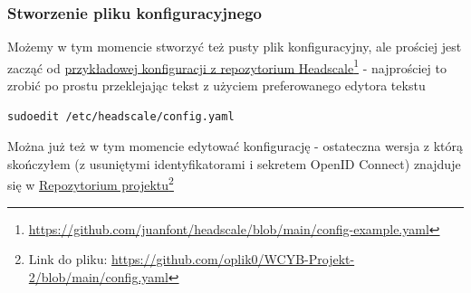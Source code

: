 \documentclass{report}
\numberwithin{equation}{section}
\begin{document}
\subsubsection{Stworzenie pliku konfiguracyjnego}

Możemy w tym momencie stworzyć też pusty plik konfiguracyjny, ale prościej jest zacząć od \href{https://github.com/juanfont/headscale/blob/main/config-example.yaml}{przykładowej konfiguracji z repozytorium Headscale}\footnote{\url{https://github.com/juanfont/headscale/blob/main/config-example.yaml}} - najprościej to zrobić po prostu przeklejając tekst z użyciem preferowanego edytora tekstu

\begin{verbatim}
sudoedit /etc/headscale/config.yaml
\end{verbatim}

Można już też w tym momencie edytować konfigurację - ostateczna wersja z którą skończyłem (z usuniętymi identyfikatorami i sekretem OpenID Connect) znajduje się w \href{https://github.com/oplik0/WCYB-Projekt-2/blob/main/config.yaml}{Repozytorium projektu}\footnote{Link do pliku: \url{https://github.com/oplik0/WCYB-Projekt-2/blob/main/config.yaml}}
\end{document}
